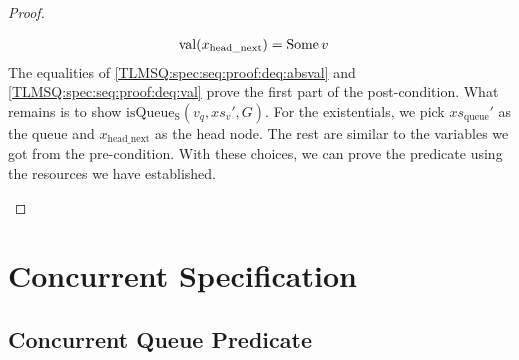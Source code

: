 \documentclass[a4paper, 10pt]{report}
\theoremstyle{definition}
\newcommand{\isqueueseq}{\operatorname{isQueue_{S}}}
\newcommand{\vq}{v_q}
\newcommand{\xsqueue}{xs_{\mathrm{queue}}}
\newcommand{\nVal}[1]{\operatorname{val}(#1)}
\newcommand{\node}{x}
\newcommand{\nodeN}[1]{\node_{\mathrm{#1}}}
\newcommand{\nodeheadnext}{\nodeN{head\_next}}
\newcommand{\absvalue}{\val}
\newcommand{\absvalueList}{xs_v}
\newcommand{\Qg}{G}
\begin{document}
\begin{proof}
\begin{itemize}
\begin{align}
    &\nVal{\nodeheadnext} = \Some{\absvalue}\label{TLMSQ:spec:seq:proof:deq:val}
  \end{align}
  The equalities of \ref{TLMSQ:spec:seq:proof:deq:absval} and \ref{TLMSQ:spec:seq:proof:deq:val} prove the first part of the post-condition. What remains is to show $\isqueueseq(\vq, \absvalueList', \Qg)$. For the existentials, we pick $\xsqueue'$ as the queue and $\nodeheadnext$ as the head node. The rest are similar to the variables we got from the pre-condition. With these choices, we can prove the predicate using the resources we have established.
\end{itemize}
\end{proof}

\section{Concurrent Specification}
\label{TLMSQSPECS:section:concurrent}

\subsection{Concurrent Queue Predicate}
\label{TLMSQSPECS:concurrent:sub:conc-queue-pred}
\end{document}
